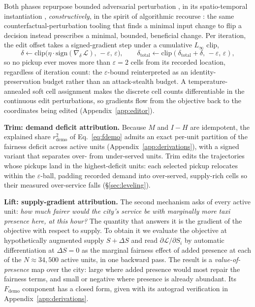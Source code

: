 Both phases repurpose bounded adversarial
perturbation \cite{goodfellow2015fgsm,kurakin2017ifgsm}, in its
spatio-temporal instantiation \cite{hu2023stifgsm}, \emph{constructively},
in the spirit of algorithmic recourse
\cite{ustun2019recourse,wachter2018counterfactual}: the same
coun\-ter\-fac\-tual-perturbation tooling that finds a minimal input change to flip
a decision instead prescribes a minimal, bounded, beneficial change. Per
iteration, the edit offset takes a signed-gradient step under a cumulative
$L_\infty$ clip,
\begin{equation}\label{eq:step}
\delta \leftarrow \mathrm{clip}\bigl(\eta \cdot
\mathrm{sign}(\nabla_{\delta}\,\mathcal{L}),\, -\varepsilon,\, \varepsilon\bigr),
\qquad
\delta_{\mathrm{total}} \leftarrow
\mathrm{clip}(\delta_{\mathrm{total}} + \delta,\, -\varepsilon,\, \varepsilon),
\end{equation}
so no pickup ever moves more than $\varepsilon = 2$ cells from its recorded
location, regardless of iteration count: the $\varepsilon$-bound
reinterpreted as an identity-preservation budget rather than an attack-stealth
budget. A temperature-annealed soft cell assignment makes the discrete
cell counts differentiable in the continuous edit perturbations, so gradients
flow from the objective back to the coordinates being edited
(Appendix~\ref{app:editor}).

\textbf{Trim: demand deficit attribution.} Because $M$ and $I-H$ are
idempotent, the explained share $r^{2}_{\mathrm{demo}}$ of
Eq.~\eqref{eq:fdemo} admits an exact per-unit partition of the fairness
deficit across active units (Appendix~\ref{app:derivations}), with a signed
variant that separates over- from under-served units. Trim edits the
trajectories whose pickups land in the highest-deficit units: each selected
pickup relocates within the $\varepsilon$-ball, padding recorded demand into
over-served, supply-rich cells so their measured over-service falls
(\S\ref{sec:leveling}).

\textbf{Lift: supply-gradient attribution.} The second mechanism asks of
every active unit: \emph{how much fairer would the city's service be with
marginally more taxi presence here, at this hour?} The quantity that answers
it is the gradient of the objective with respect to supply. To obtain it we
evaluate the objective at hypothetically augmented supply $S + \Delta S$ and
read $\partial \mathcal{L} / \partial S_i$ by automatic differentiation at
$\Delta S = 0$ as the marginal fairness effect of added presence at each of
the $N \approx 34{,}500$ active units, in one backward pass. The result is a
\emph{value-of-presence} map over the city: large where added presence would
most repair the fairness terms, and small or negative where presence is
already abundant. Its $F_{\mathrm{demo}}$ component has a closed form, given
with its autograd verification in Appendix~\ref{app:derivations}.

